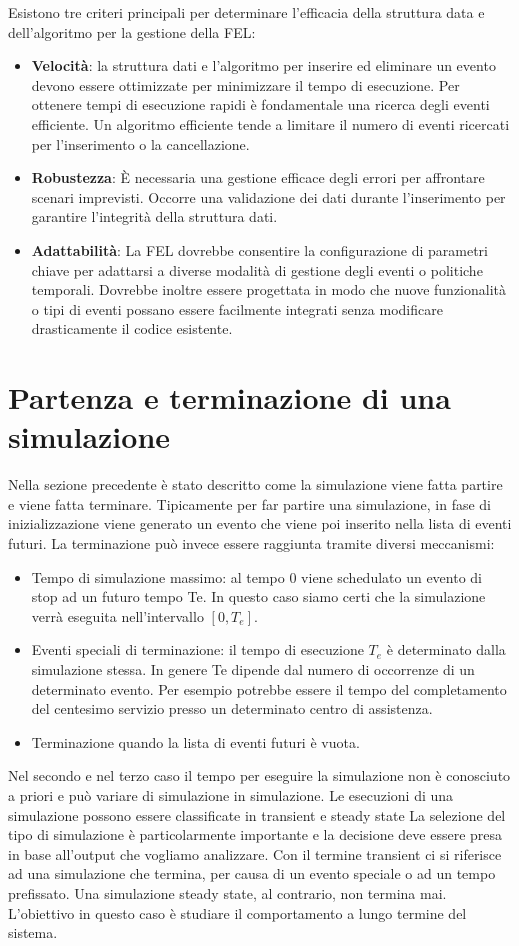 Esistono tre criteri principali per determinare l'efficacia della struttura data e dell'algoritmo per la gestione della FEL: 
\begin{itemize}
    \item \textbf{Velocità}: la struttura dati e l'algoritmo per inserire ed eliminare un evento devono essere ottimizzate per minimizzare il tempo di esecuzione. Per ottenere tempi di esecuzione rapidi è fondamentale una ricerca degli eventi efficiente. Un algoritmo efficiente tende a limitare il numero di eventi ricercati per l'inserimento o la cancellazione. 
    \item  \textbf{Robustezza}: È necessaria una gestione efficace degli errori per affrontare scenari imprevisti. Occorre una validazione dei dati durante l'inserimento per garantire l'integrità della struttura dati.  
    \item \textbf{Adattabilità}: La FEL dovrebbe consentire la configurazione di parametri chiave per adattarsi a diverse modalità di gestione degli eventi o politiche temporali. Dovrebbe inoltre essere progettata in modo che nuove funzionalità o tipi di eventi possano essere facilmente integrati senza modificare drasticamente il codice esistente. 
\end{itemize}

\section{Partenza e terminazione di una simulazione}
Nella sezione precedente è stato descritto come la simulazione viene fatta partire e viene fatta terminare. Tipicamente per far partire una simulazione, in fase di inizializzazione viene generato un evento che viene poi inserito nella lista di eventi futuri. 
La terminazione può invece essere raggiunta tramite diversi meccanismi: 
\begin{itemize}
    \item Tempo di simulazione massimo: al tempo 0 viene schedulato un evento di stop ad un futuro tempo Te. In questo caso siamo certi che la simulazione verrà eseguita nell'intervallo $[0, T_e]$.
    \item Eventi speciali di terminazione: il tempo di esecuzione $T_e$ è determinato dalla simulazione stessa. In genere Te dipende dal numero di occorrenze di un determinato evento. Per esempio potrebbe essere il tempo del completamento del centesimo servizio presso un determinato centro di assistenza. 
    \item Terminazione quando la lista di eventi futuri è vuota.
\end{itemize}
Nel secondo e nel terzo caso il tempo per eseguire la simulazione non è conosciuto a priori e può variare di simulazione in simulazione.
Le esecuzioni di una simulazione possono essere classificate in transient e steady state La selezione del tipo di simulazione è particolarmente importante e la decisione deve essere presa in base all'output che vogliamo analizzare. Con il termine transient ci si riferisce ad una simulazione che termina, per causa di un evento speciale o ad un tempo prefissato. 
Una simulazione steady state, al contrario, non termina mai. L'obiettivo in questo caso è studiare il comportamento a lungo termine del sistema. 

